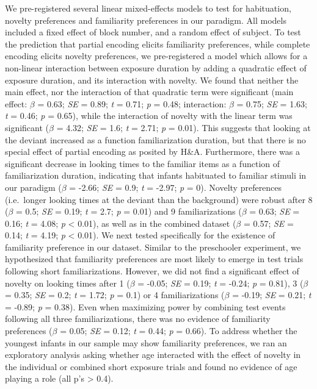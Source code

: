 \documentclass[10pt, letterpaper]{article}
\begin{document}
We pre-registered several linear mixed-effects models to test for
habituation, novelty preferences and familiarity preferences in our
paradigm. All models included a fixed effect of block number, and a
random effect of subject. To test the prediction that partial encoding
elicits familiarity preferences, while complete encoding elicits novelty
preferences, we pre-registered a model which allows for a non-linear
interaction between exposure duration by adding a quadratic effect of
exposure duration, and its interaction with novelty. We found that
neither the main effect, nor the interaction of that quadratic term were
significant (main effect: \(\beta\) = 0.63; \emph{SE} = 0.89; \emph{t} =
0.71; \emph{p} = 0.48; interaction: \(\beta\) = 0.75; \emph{SE} = 1.63;
\emph{t} = 0.46; \emph{p} = 0.65), while the interaction of novelty with
the linear term was significant (\(\beta\) = 4.32; \emph{SE} = 1.6;
\emph{t} = 2.71; \emph{p} = 0.01). This suggests that looking at the
deviant increased as a function familiarization duration, but that there
is no special effect of partial encoding as posited by H\&A.
Furthermore, there was a significant decrease in looking times to the
familiar items as a function of familiarization duration, indicating
that infants habituated to familiar stimuli in our paradigm (\(\beta\) =
-2.66; \emph{SE} = 0.9; \emph{t} = -2.97; \emph{p} = 0). Novelty
preferences (i.e.~longer looking times at the deviant than the
background) were robust after 8 (\(\beta\) = 0.5; \emph{SE} = 0.19;
\emph{t} = 2.7; \emph{p} = 0.01) and 9 familiarizations (\(\beta\) =
0.63; \emph{SE} = 0.16; \emph{t} = 4.08; \emph{p} \textless{} 0.01), as
well as in the combined dataset (\(\beta\) = 0.57; \emph{SE} = 0.14;
\emph{t} = 4.19; \emph{p} \textless{} 0.01). We next tested specifically
for the existence of familiarity preference in our dataset. Similar to
the preschooler experiment, we hypothesized that familiarity preferences
are most likely to emerge in test trials following short
familiarizations. However, we did not find a significant effect of
novelty on looking times after 1 (\(\beta\) = -0.05; \emph{SE} = 0.19;
\emph{t} = -0.24; \emph{p} = 0.81), 3 (\(\beta\) = 0.35; \emph{SE} =
0.2; \emph{t} = 1.72; \emph{p} = 0.1) or 4 familiarizations (\(\beta\) =
-0.19; \emph{SE} = 0.21; \emph{t} = -0.89; \emph{p} = 0.38). Even when
maximizing power by combining test events following all three
familiarizations, there was no evidence of familiarity preferences
(\(\beta\) = 0.05; \emph{SE} = 0.12; \emph{t} = 0.44; \emph{p} = 0.66).
To address whether the youngest infants in our sample may show
familiarity preferences, we ran an exploratory analysis asking whether
age interacted with the effect of novelty in the individual or combined
short exposure trials and found no evidence of age playing a role (all
p's \textgreater{} 0.4).
\end{document}
